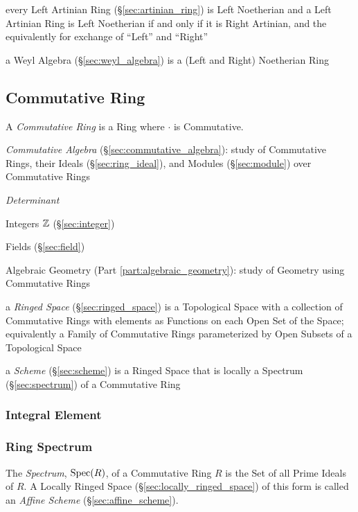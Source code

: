every Left Artinian Ring (\S\ref{sec:artinian_ring}) is Left Noetherian and a
Left Artinian Ring is Left Noetherian if and only if it is Right Artinian, and
the equivalently for exchange of ``Left'' and ``Right''

\fist a Weyl Algebra (\S\ref{sec:weyl_algebra}) is a (Left and Right)
Noetherian Ring



\subsection{Commutative Ring}\label{sec:commutative_ring}

A \emph{Commutative Ring} is a Ring where $\cdot$ is Commutative.

\fist \emph{Commutative Algebra} (\S\ref{sec:commutative_algebra}): study of
Commutative Rings, their Ideals (\S\ref{sec:ring_ideal}), and Modules
(\S\ref{sec:module}) over Commutative Rings

\emph{Determinant}

Integers $\mathbb{Z}$ (\S\ref{sec:integer})

Fields (\S\ref{sec:field})

Algebraic Geometry (Part \ref{part:algebraic_geometry}): study of
Geometry using Commutative Rings

\fist a \emph{Ringed Space} (\S\ref{sec:ringed_space}) is a Topological Space
with a collection of Commutative Rings with elements as Functions on each Open
Set of the Space; equivalently a Family of Commutative Rings parameterized by
Open Subsets of a Topological Space

\fist a \emph{Scheme} (\S\ref{sec:scheme}) is a Ringed Space that is locally a
Spectrum (\S\ref{sec:spectrum}) of a Commutative Ring



\subsubsection{Integral Element}\label{sec:integral_element}

\subsubsection{Ring Spectrum}\label{sec:ring_spectrum}

The \emph{Spectrum}, $\mathrm{Spec}(R)$, of a Commutative Ring $R$ is the Set of all
Prime Ideals of $R$. A Locally Ringed Space (\S\ref{sec:locally_ringed_space})
of this form is called an \emph{Affine Scheme} (\S\ref{sec:affine_scheme}).

